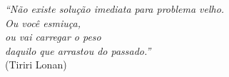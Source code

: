 \begin{epigrafe}
    \vspace*{\fill}
	\begin{flushright}

		\textit{``Não existe solução imediata para problema velho. \\
		Ou você esmiuça, \\
		ou vai carregar o peso\\
		daquilo que arrastou do passado.''}\\
		(Tiriri Lonan)
	\end{flushright}
\end{epigrafe}
